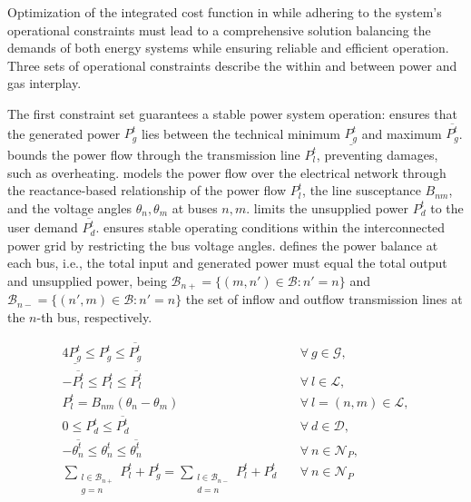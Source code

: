 Optimization of the integrated cost function in  while adhering to the system's operational constraints must lead to a comprehensive solution balancing the demands of both energy systems while ensuring reliable and efficient operation. Three sets of operational constraints describe the within and between power and gas interplay.

The first constraint set guarantees a stable power system operation:  ensures that the generated power $P_{g}^t$ lies between the technical minimum $\underline{P_g^t}$ and maximum $\overline{P_g^t}$.  bounds the power flow through the transmission line $P_{l}^t$, preventing damages, such as overheating.  models the power flow over the electrical network through the reactance-based relationship of the power flow $P_{l}^t$, the line susceptance $B_{nm}$, and the voltage angles $\theta_n,\theta_{m}$ at buses $n,m$.  limits the unsupplied power $P_{d}^t$ to the user demand $\overline{P_{d}^t}$.  ensures stable operating conditions within the interconnected power grid by restricting the bus voltage angles.  defines the power balance at each bus, i.e., the total input and generated power must equal the total output and unsupplied power, being $\mathcal{B}_{n+}=\{(m,n')\in\mathcal{B}:n'=n\}$ and $\mathcal{B}_{n-}=\{(n',m)\in\mathcal{B}:n'=n\}$ the set of inflow and outflow transmission lines at the $n$-th bus, respectively.

\begin{alignat}{4}
    \underline{P_g^t} \leq P_{g}^t \leq \overline{P_g^t} &\quad \forall \ g \in \mathcal{G}, \label{eq:gen_limits} \\
    -\overline{P_l^t} \leq P_{l}^t \leq \overline{P_l^t} &\quad \forall \ l \in \mathcal{L}, \label{eq:line_limits} \\
    P_{l}^t = B_{nm}(\theta_n - \theta_{m}) &\quad \forall \ l = (n, m) \in \mathcal{L} , \label{eq:dc_power_flow} \\
    0 \leq P_{d}^t \leq \overline{P_{d}^t} &\quad \forall \ d \in \mathcal{D}, \label{eq:dem_limit_power} \\
    -\overline{\theta_{n}^t} \leq \theta_{n}^t \leq \overline{\theta_{n}^t} &\quad \forall \ n \in \mathcal{N}_P, \label{eq:voltage_angle_limits} \\
    \sum_{\substack{l\in \mathcal{B}_{n+}\\g=n}}{P_{l}^t + P_{g}^t} = \sum_{\substack{l\in \mathcal{B}_{n-}\\d=n}} P_{l}^t + P_{d}^t &\quad \forall \ n \in \mathcal{N}_P \label{eq:power_balance} 
\end{alignat}

